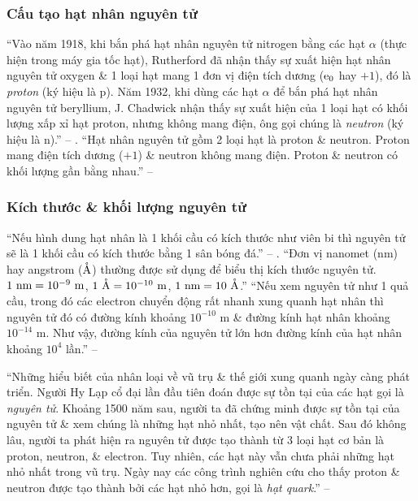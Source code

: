 \documentclass{article}
\numberwithin{equation}{section}
\begin{document}
\subsubsection{Cấu tạo hạt nhân nguyên tử}
``Vào năm 1918, khi bắn phá hạt nhân nguyên tử nitrogen bằng các hạt $\alpha$ (thực hiện trong máy gia tốc hạt), Rutherford đã nhận thấy sự xuất hiện hạt nhân nguyên tử oxygen \& 1 loại hạt mang 1 đơn vị điện tích dương (${\rm e}_0$ hay $+1$), đó là \textit{proton} (ký hiệu là p). Năm 1932, khi dùng các hạt $\alpha$ để bắn phá hạt nhân nguyên tử beryllium, J. Chadwick nhận thấy sự xuất hiện của 1 loại hạt có khối lượng xấp xỉ hạt proton, nhưng không mang điện, ông gọi chúng là \textit{neutron} (ký hiệu là n).'' -- \cite[pp. 16--17]{SGK_Hoa_Hoc_10_Chan_Troi_Sang_Tao}. ``Hạt nhân nguyên tử gồm 2 loại hạt là proton \& neutron. Proton mang điện tích dương ($+1$) \& neutron không mang điện. Proton \& neutron có khối lượng gần bằng nhau.'' -- \cite[p. 17]{SGK_Hoa_Hoc_10_Chan_Troi_Sang_Tao}

\subsubsection{Kích thước \& khối lượng nguyên tử}
``Nếu hình dung hạt nhân là 1 khối cầu có kích thước như viên bi thì nguyên tử sẽ là 1 khối cầu có kích thước bằng 1 sân bóng đá.'' -- \cite[p. 17]{SGK_Hoa_Hoc_10_Chan_Troi_Sang_Tao}. ``Đơn vị nanomet (nm) hay angstrom ($\mathring{\rm A}$) thường được sử dụng để biểu thị kích thước nguyên tử. $\rm 1\ nm = 10^{-9}\ m$, $\rm 1\ \mathring{\rm A} = 10^{-10}\ m$, $\rm 1\ nm = 10\ \mathring{\rm A}$.'' ``Nếu xem nguyên tử như 1 quả cầu, trong đó các electron chuyển động rất nhanh xung quanh hạt nhân thì nguyên tử đó có đường kính khoảng $10^{-10}$ m \& đường kính hạt nhân khoảng $10^{-14}$ m. Như vậy, đường kính của nguyên tử lớn hơn đường kính của hạt nhân khoảng $10^4$ lần.'' -- \cite[p. 18]{SGK_Hoa_Hoc_10_Chan_Troi_Sang_Tao}

``Những hiểu biết của nhân loại về vũ trụ \& thế giới xung quanh ngày càng phát triển. Người Hy Lạp cổ đại lần đầu tiên đoán được sự tồn tại của các hạt gọi là \textit{nguyên tử}. Khoảng 1500 năm sau, người ta đã chứng minh được sự tồn tại của nguyên tử \& xem chúng là những hạt nhỏ nhất, tạo nên vật chất. Sau đó không lâu, người ta phát hiện ra nguyên tử được tạo thành từ 3 loại hạt cơ bản là proton, neutron, \& electron. Tuy nhiên, các hạt này vẫn chưa phải những hạt nhỏ nhất trong vũ trụ. Ngày nay các công trình nghiên cứu cho thấy proton \& neutron được tạo thành bởi các hạt nhỏ hơn, gọi là \textit{hạt quark}.'' -- \cite[p. 18]{SGK_Hoa_Hoc_10_Chan_Troi_Sang_Tao}
\end{document}
